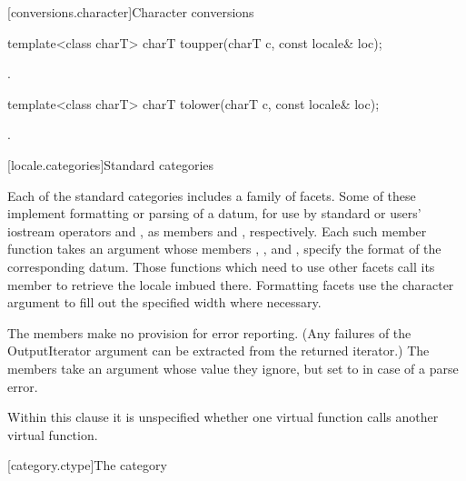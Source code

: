 [conversions.character]{Character conversions}

%
\begin{itemdecl}
template<class charT> charT toupper(charT c, const locale& loc);
\end{itemdecl}

\begin{itemdescr}
\pnum
\returns
{}.
\end{itemdescr}

%
\begin{itemdecl}
template<class charT> charT tolower(charT c, const locale& loc);
\end{itemdecl}

\begin{itemdescr}
\pnum
\returns
{}.
\end{itemdescr}

[locale.categories]{Standard  categories}

\pnum
Each of the standard categories includes a family of facets.
Some of these implement formatting or parsing of a datum, for use
by standard or users' iostream operators
\tcode{<<} and \tcode{>>},
as members
and
,
respectively.
Each such member function takes an
%
argument whose members
%
,
%
,
and
%
,
specify the format of the corresponding datum.
Those functions which need to use other facets call its member
to retrieve the locale imbued there.
Formatting facets use the character argument
to fill out the specified width where necessary.

\pnum
The
members make no provision for error reporting.
(Any failures of the
OutputIterator argument can be extracted from the returned iterator.)
The
members take an
argument whose value they ignore, but set to
in case of a parse error.

\pnum
Within this clause it is unspecified whether one virtual function calls another
virtual function.

[category.ctype]{The  category}

